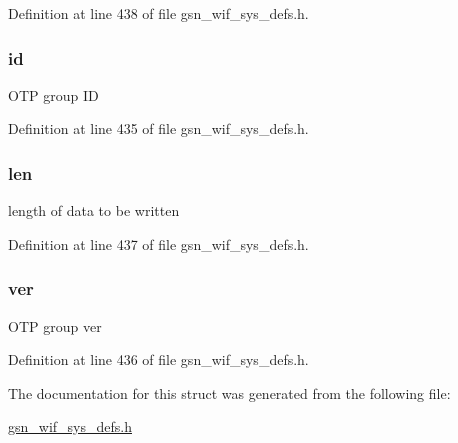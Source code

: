 Definition at line 438 of file gsn\_\-wif\_\-sys\_\-defs.h.

\hypertarget{a00360_a583a14d715339a2c22d205223d366263}{
\subsubsection[{id}]{ {\bf id}}}
\label{a00360_a583a14d715339a2c22d205223d366263}
OTP group ID 

Definition at line 435 of file gsn\_\-wif\_\-sys\_\-defs.h.

\hypertarget{a00360_ab3bcead9c261261394a5d9b3bf8f95cb}{
\subsubsection[{len}]{ {\bf len}}}
\label{a00360_ab3bcead9c261261394a5d9b3bf8f95cb}
length of data to be written 

Definition at line 437 of file gsn\_\-wif\_\-sys\_\-defs.h.

\hypertarget{a00360_a2ac44d771c9e31ef7508150a7082e8cf}{
\subsubsection[{ver}]{ {\bf ver}}}
\label{a00360_a2ac44d771c9e31ef7508150a7082e8cf}
OTP group ver 

Definition at line 436 of file gsn\_\-wif\_\-sys\_\-defs.h.



The documentation for this struct was generated from the following file:\begin{DoxyCompactItemize}
\item 
\hyperlink{a00612}{gsn\_\-wif\_\-sys\_\-defs.h}\end{DoxyCompactItemize}
